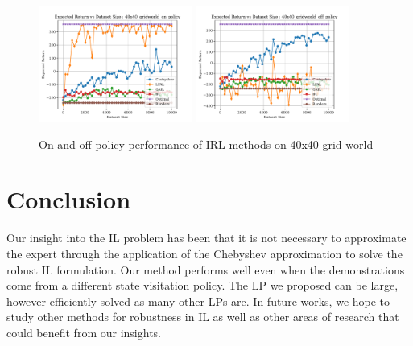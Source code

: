 \documentclass[11pt]{uai2023}
\begin{document}
\begin{figure}[htbp]
	\centering
	\includegraphics[width=0.45\textwidth]{../src/plots/returns/40x40_gridworld_on_policy_returns.pdf}
	\includegraphics[width=0.45\textwidth]{../src/plots/returns/40x40_gridworld_off_policy_returns.pdf}
	\caption{On and off policy performance of IRL methods on 40x40 grid world}
	\label{fig:off_policy_vs_on_40}
\end{figure}

\section{Conclusion}
Our insight into the IL problem has been that it is not necessary to approximate the expert through the application of the Chebyshev approximation to solve the robust IL formulation. 
Our method performs well even when the demonstrations come from a different state visitation policy.
The LP we proposed can be large, however efficiently solved as many other LPs are.
In future works, we hope to study other methods for robustness in IL as well as other areas of research that could benefit from our insights.



\end{document}

